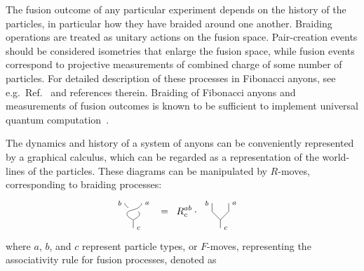 \documentclass[aps, prl, letterpaper, twocolumn, superscriptaddress, notitlepage, 10pt]{revtex4-1}
\begin{document}
The fusion outcome of any particular experiment depends on the history of the particles, in 
particular how they have braided around one another. Braiding operations are treated as 
unitary actions on the fusion space. Pair-creation events should be considered isometries 
that enlarge the fusion space, while fusion events correspond to projective measurements 
of combined charge of some number of particles. For detailed description of these 
processes in Fibonacci anyons, see e.g.~Ref.~\cite{Nayak2008} and references therein. 
Braiding of Fibonacci anyons and measurements of fusion outcomes is known to be 
sufficient to implement universal quantum computation~\cite{Freedman2002, Nayak2008}.

The dynamics and history of a system of anyons can be conveniently represented by a graphical calculus, which can be regarded as a representation of the world-lines of the particles. These diagrams can be manipulated by $R$-moves, corresponding to braiding processes:
	\begin{align}
		\begin{tikzpicture}[baseline=0.5cm,scale=0.3]		
			\draw(0,0)--(0,1);
			\draw plot [smooth, tension=1] coordinates { (0,1) (0.75,1.8) (-0.6,2.45) (-1,3)};
			\draw[color=white, line width=7] plot [smooth, tension=1] coordinates { (0,1) (-0.75,1.8) (0.6,2.45) (1,3)};
			\draw plot [smooth, tension=1] coordinates { (0,1) (-0.75,1.8) (0.6,2.45) (1,3)};
			\node at (0,0) [anchor=west] {{\scriptsize $c$}};
			\node at (-1,3) [anchor=east] {{\scriptsize $b$}};
			\node at (1,3) [anchor=west] {{\scriptsize $a$}};
		\end{tikzpicture}
		&\;\;=\;\;R^{ab}_c\cdot\;
		\begin{tikzpicture}[baseline=0.5cm,scale=0.3]		
			\draw(0,0)--(0,1);
			\draw(0,1)--(-1,2)--(-1,3);
			\draw(0,1)--(1,2)--(1,3);
			\node at (0,0) [anchor=west] {{\scriptsize $c$}};
			\node at (-1,3) [anchor=east] {{\scriptsize $b$}};
			\node at (1,3) [anchor=west] {{\scriptsize $a$}};
		\end{tikzpicture}
	\end{align}
where $a$, $b$, and $c$ represent particle types, or $F$-moves, representing the associativity rule for fusion processes, denoted as
\end{document}

